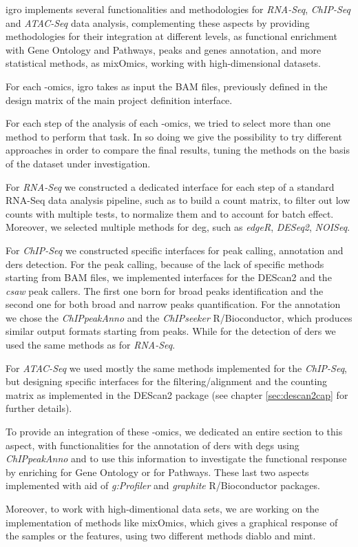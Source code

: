 \gls{igro} implements several functionalities and methodologies for \textit{RNA-Seq}, \textit{ChIP-Seq} and \textit{ATAC-Seq} data analysis, complementing these aspects by providing methodologies for their integration at different levels, as functional enrichment with Gene Ontology and Pathways,  peaks and genes annotation, and more statistical methods, as mixOmics, working with high-dimensional datasets.

For each -omics, \gls{igro} takes as input the BAM files, previously defined in the design matrix of the main project definition interface.

For each step of the analysis of each -omics, we tried to select more than one method to perform that task. 
In so doing we give the possibility to try different approaches in order to compare the final results, tuning the methods on the basis of the dataset under investigation.

For \textit{RNA-Seq} we constructed a dedicated interface for each step of a standard RNA-Seq data analysis pipeline, such as to build a count matrix, to filter out low counts with multiple tests, to normalize them and to account for batch effect. 
Moreover, we selected multiple methods for \gls{deg}, such as \textit{edgeR}, \textit{DESeq2}, \textit{NOISeq}.

For \textit{ChIP-Seq} we constructed specific interfaces for peak calling, annotation and \glspl{der} detection.
For the peak calling, because of the lack of specific methods starting from BAM files, we implemented interfaces for the DEScan2 and the \textit{csaw}\cite{Lun2015} peak callers. The first one born for broad peaks identification and the second one for both broad and narrow peaks quantification.
For the annotation we chose the \textit{ChIPpeakAnno} and the \textit{ChIPseeker} R/Bioconductor, which produces similar output formats starting from peaks. While for the detection of \glspl{der} we used the same methods as for \textit{RNA-Seq}.

For \textit{ATAC-Seq} we used mostly the same methods implemented for the \textit{ChIP-Seq}, but designing specific interfaces for the filtering/alignment and the counting matrix as implemented in the DEScan2 package (see chapter \ref{sec:descan2cap} for further details).

To provide an integration of these -omics, we dedicated an entire section to this aspect, with functionalities for the annotation of \glspl{der} with \glspl{deg} using \textit{ChIPpeakAnno} and to use this information to investigate the functional response by enriching for Gene Ontology or for Pathways.
These last two aspects implemented with aid of \textit{g:Profiler} \cite{Reimand2016} and \textit{graphite} \cite{Sales2012a} R/Bioconductor packages.

Moreover, to work with high-dimentional data sets, we are working on the implementation of methods like mixOmics, which gives a graphical response of the samples or the features, using two different methods diablo and mint.